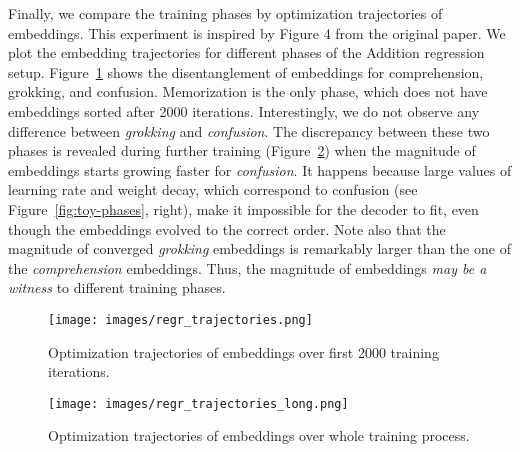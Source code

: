 Finally, we compare the training phases by optimization trajectories of embeddings. This experiment is inspired by Figure 4 from the original paper. We plot the embedding trajectories for different phases of the Addition regression setup. Figure~\ref{fig:embeds} shows the disentanglement of embeddings for comprehension, grokking, and confusion. Memorization is the only phase, which does not have embeddings sorted after 2000 iterations. Interestingly, we do not observe any difference between \textit{grokking} and \textit{confusion}. The discrepancy between these two phases is revealed during further training (Figure~\ref{fig:embeds-long}) when the magnitude of embeddings starts growing faster for \textit{confusion}. It happens because large values of learning rate and weight decay, which correspond to confusion (see Figure~\ref{fig:toy-phases}, right), make it impossible for the decoder to fit, even though the embeddings evolved to the correct order. Note also that the magnitude of converged \textit{grokking} embeddings is remarkably larger than the one of the \textit{comprehension} embeddings. Thus, the magnitude of embeddings \textit{may be a witness} to different training phases.
\begin{figure}[H]
\caption{Optimization trajectories of embeddings over first 2000 training iterations.}
\centering
\texttt{[image: images/regr\_trajectories.png]}
\label{fig:embeds}
\end{figure}

\begin{figure}[H]
\caption{Optimization trajectories of embeddings over whole training process.}
\centering
\texttt{[image: images/regr\_trajectories\_long.png]}
\label{fig:embeds-long}
\end{figure}
